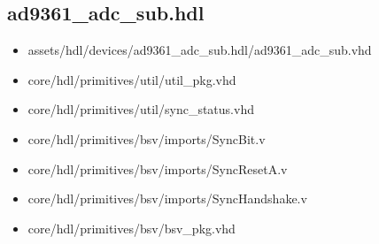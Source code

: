 \documentclass{article}
\def\comp{ad9361\_adc\_sub}
\begin{document}
\subsection*{\comp.hdl}
\begin{itemize}
	\item assets/hdl/devices/\comp.hdl/\comp.vhd
	\item core/hdl/primitives/util/util\_pkg.vhd
	\item core/hdl/primitives/util/sync\_status.vhd
	\item core/hdl/primitives/bsv/imports/SyncBit.v
	\item core/hdl/primitives/bsv/imports/SyncResetA.v
	\item core/hdl/primitives/bsv/imports/SyncHandshake.v
	\item core/hdl/primitives/bsv/bsv\_pkg.vhd
\end{itemize}
\end{document}
